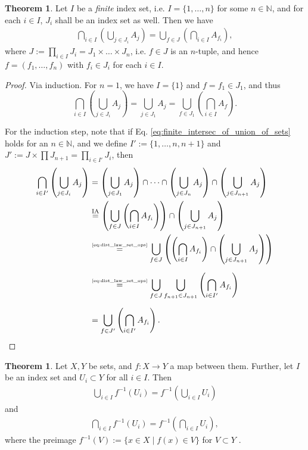 \documentclass[12pt, a4paper]{article}
\numberwithin{equation}{section}
\theoremstyle{definition}
\theoremstyle{definition}
\newtheorem{theorem}[thm]{Theorem}
\begin{document}
	\begin{theorem}\label{thrm:finite_intersec_of_union_of_sets}
		Let $I$ be a \textit{finite} index set, i.e. $I = \{1, \dots, n\}$ for some $n\in \mathbb N$, and for each $i\in I$, $J_i$ shall be an index set as well. Then we have
		\begin{align}\label{eq:finite_intersec_of_union_of_sets}
			\bigcap_{i\in I}\left(\bigcup_{j\in J_i}A_j\right) = \bigcup_{f\in J}\left(\bigcap_{i\in I}A_{f_i}\right),
		\end{align}
		where $J := \prod_{i\in I}J_i = J_1\times \dots\times J_n$, i.e. $f\in J$ is an $n$-tuple, and hence $f = (f_1, \dots, f_n)$ with $f_i\in J_i$ for each $i\in I$.
	\end{theorem}
	
	\begin{proof}
		Via induction. For $n = 1$, we have $I = \{1\}$ and $f = f_1\in J_1$, and thus
		$$\bigcap_{i\in I}\left(\bigcup_{j\in J_i}A_j\right) = \bigcup_{j\in J_1} A_j = \bigcup_{f\in J_1}\left(\bigcap_{i\in I}A_{f}\right).$$
		
		For the induction step, note that if Eq. \eqref{eq:finite_intersec_of_union_of_sets} holds for an $n\in\mathbb N$, and we define $I' := \{1, \dots, n, n+1\}$ and $J' := J\times\prod J_{n+1} = \prod_{i\in I'}J_i$, then
		\begin{align*}
			\bigcap_{i\in I'}\left(\bigcup_{j\in J_i}A_j\right) 
			&= \left( \bigcup_{j\in J_1}A_j \right) \cap \dots\cap \left(\bigcup_{j\in J_n}A_j\right)\cap \left(\bigcup_{j\in J_{n+1}}A_j\right) 
			\\ &\overset{\small\text{IA}}{=} \left(\bigcup_{f\in J}\left(\bigcap_{i\in I}A_{f_i}\right)\right) \cap \left(\bigcup_{j\in J_{n+1}}A_j\right) 
			\\ &\overset{\tiny\eqref{eq:dist_law_set_ops}}{=} \bigcup_{f\in J}\left(\left( \bigcap_{i\in I}A_{f_i}\right) \cap \left( \bigcup_{j\in J_{n+1}}A_j \right)\right)
			\\[6pt] &\overset{\tiny\eqref{eq:dist_law_set_ops}}{=} \bigcup_{f\in J}\bigcup_{f_{n+1}\in J_{n+1}} \left( \bigcap_{i\in I'}A_{f_i}\right)
			\\[6pt] &= \bigcup_{f\in J'}\left( \bigcap_{i\in I'}A_{f_i}\right).
		\end{align*}
	\end{proof}

	\begin{theorem}\label{thrm:set_theory_unions_intersects_preimages}
		Let $X, Y$ be sets, and $f: X\to Y$ a map between them. Further, let $I$ be an index set and $U_i\subset Y$ for all $i\in I$. Then
		\begin{align}\label{eq:set_theory_unions_preimages}
			\bigcup_{i\in I}f^{-1}(U_i) = f^{-1}\left(\bigcup_{i\in I}U_i\right)
		\end{align}
		and
		\begin{align}\label{eq:set_theory_intersects_preimages}
			\bigcap_{i\in I}f^{-1}(U_i) = f^{-1}\left(\bigcap_{i\in I}U_i\right),
		\end{align}
		where the preimage $f^{-1}(V) := \{x\in X\mid f(x)\in V\}$ for $V\subset Y$ \cite{141357,2190480}.
	\end{theorem}
\end{document}
